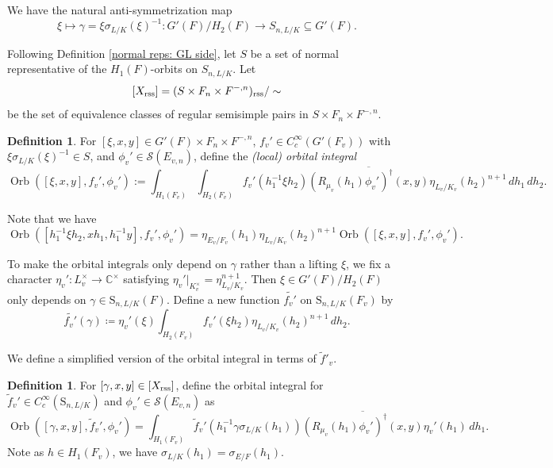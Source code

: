\documentclass[11pt, reqno]{amsart}
\numberwithin{equation}{subsection}
\theoremstyle{plain}
\theoremstyle{definition}
\newtheorem{definition}[proposition]{Definition}
\newcommand{\wt}{\widetilde}
\newcommand{\BC}{\mathbb C}
\newcommand{\ol}{\overline}
\newcommand{\cS}{\mathcal S}
\DeclareMathOperator{\Orb}{Orb}
\newcommand{\rss}{\textnormal{rss}}
\begin{document}
We have the natural anti-symmetrization map 
$$
\xi \mapsto \gamma=\xi \sigma_{L/K}(\xi)^{-1} \colon G'(F)/H_2(F) \to S_{n,L/K} \subseteq G'(F).
$$

Following Definition \ref{normal reps: GL side}, let $S$ be a
set of normal representative of the $H_1(F)$-orbits 
on $S_{n,L/K}$. Let
\[
[X_\rss]=(S \times F_n \times F^{-,n})_\rss / \sim
\]
be the set of equivalence classes of regular semisimple pairs in $S \times F_n \times F^{-,n}$.


\begin{definition}\label{defn: local orb GL side}
For $[\xi, x, y] \in G'(F) \times F_n \times F^{-,n}$,
$f_v' \in C_c^\infty(G'(F_v))$ with $\xi\sigma_{L/K}(\xi)^{-1} \in S$, and $\phi_v' \in \cS(E_{v,n})$,
define the \emph{(local) orbital integral}
\begin{equation}
    \Orb([\xi, x, y], f_v', \phi_v'):= \int_{H_1(F_v)}\int_{H_2(F_v)}
        f_v'(h_1^{-1}\xi h_2) 
        \ol{(R_{\mu_v}(h_1) \phi_v')^\dagger(x, y)}
        \eta_{L_v/K_v}(h_2)^{n+1}\, dh_1 \, dh_2.
\end{equation}        
\end{definition}

Note that we have
\[
    \Orb([h_1^{-1}\xi h_2, xh_1, h_1^{-1}y],
    f_v', \phi_v')
    = \eta_{E_v/F_v}(h_1)\eta_{L_v/K_v}(h_2)^{n+1}
   \Orb([\xi, x, y], f_v', \phi_v') .
\]


To make the orbital integrals only depend on $\gamma$
rather than a lifting $\xi$, we fix a character $\eta_v' \colon L_v^\times \to \BC^\times$
satisfying $\eta_v'|_{K_v^\times} 
= \eta_{L_v/K_v}^{n+1}$. Then $\xi \in G'(F)/H_2(F)$ only depends on $\gamma \in \mathrm{S}_{n,L/K}(F)$. Define a new function $\widetilde {f_v'}$ on $\mathrm{S}_{n,L/K}(F_v)$ by
\begin{equation}
\label{eq:ftilde}
 \widetilde {f_v'} (\gamma) \coloneqq
    \eta_v'(\xi)\int_{H_2(F_v)} f_v'(\xi h_2)
    \eta_{L_v/K_v}(h_2)^{n+1}\, dh_2.    
\end{equation}   

We define a simplified version of the orbital
integral in terms of $\wt f'_v$.

\begin{definition} \label{defn: semip orb int on GL side}
For $[\gamma, x, y] \in [X_\rss]$, define the orbital integral for $\widetilde f_v' \in C_c^\infty(\mathrm{S}_{n,L/K})$ and $\phi_v' \in \cS(E_{v,n})$ as 
\[
    \Orb([\gamma, x, y], \widetilde f_v', \phi_v')
    = \int_{H_1(F_v)}
    \widetilde f_v'(h_1^{-1}\gamma \sigma_{L/K}(h_1) ) \ol{(R_{\mu_v}(h_1)\phi_v')^\dagger(x, y)}
    \eta_v'(h_1)\, dh_1.
\]
Note as $h \in H_1(F_v)$, we have $\sigma_{L/K}(h_1)=\sigma_{E/F}(h_1)$.


\end{definition}
\end{document}
